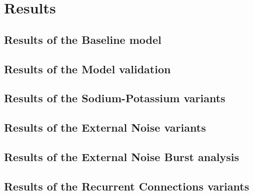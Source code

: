 \chapter{Results}


\section{Results of the Baseline model}

\section{Results of the Model validation}

\section{Results of the Sodium-Potassium variants}

\section{Results of the External Noise variants}

\section{Results of the External Noise Burst analysis}

\section{Results of the Recurrent Connections variants}
